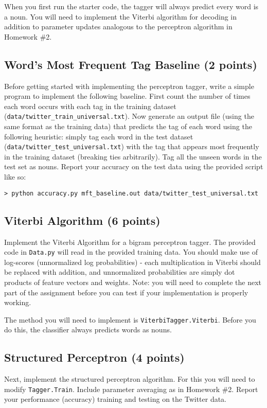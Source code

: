\documentclass[12pt, letterpaper]{article}
\begin{document}
When you first run the starter code, the tagger will always predict every word is a noun.  You will need to
implement the Viterbi algorithm for decoding in addition to parameter updates analogous to the
perceptron algorithm in Homework \#2. 

\subsection*{Word's Most Frequent Tag Baseline (2 points)}
Before getting started with implementing the perceptron tagger, write a simple program to implement the following baseline.
First count the number of times each word occurs with each tag in the training dataset ({\tt data/twitter\_train\_universal.txt}).
Now generate an output file (using the same format as the training data) that predicts the tag of each word using the
following heuristic: simply tag each word in the test dataset ({\tt data/twitter\_test\_universal.txt}) with the tag that appears most frequently in the
training dataset (breaking ties arbitrarily).  Tag all the unseen words in the test set as nouns.
Report your accuracy on the test data using the provided script like so:

\begin{verbatim}
> python accuracy.py mft_baseline.out data/twitter_test_universal.txt
\end{verbatim}

\subsection*{Viterbi Algorithm (6 points)}
Implement the Viterbi Algorithm for a bigram perceptron tagger.  The provided code in {\tt Data.py} will read in the provided training data.
You should make use of log-scores (unnormalized log probabilities) - each multiplication in Viterbi should
be replaced with addition, and unnormalized probabilities are simply dot products of feature vectors and weights.
Note: you will need to complete the next part of the assignment before you can test if your implementation is properly working.

The method you will need to implement is {\tt ViterbiTagger.Viterbi}.  Before you do this, the classifier always predicts words as nouns.

\subsection*{Structured Perceptron (4 points)}
Next, implement the structured perceptron algorithm.  For this you will need to modify {\tt Tagger.Train}.  Include
parameter averaging as in Homework \#2.
Report your performance (accuracy) training and testing on the Twitter data.
\end{document}
